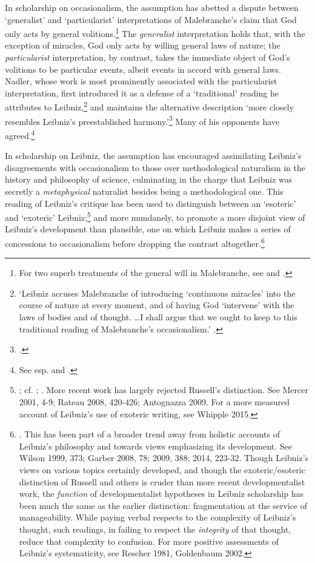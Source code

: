 \documentclass{article}
\begin{document}
In scholarship on occasionalism, the assumption has abetted a dispute
between `generalist' and `particularist' interpretations of
Malebranche's claim that God only acts by general volitions.\footnote{For
  two superb treatments of the general will in Malebranche, see \autocite{Schmaltz2008} and \autocite{Wahl2011}.} The \emph{generalist} interpretation holds that,
with the exception of miracles, God only acts by willing general laws of
nature; the \emph{particularist} interpretation, by contrast, takes the
immediate object of God's volitions to be particular events, albeit
events in accord with general laws. Nadler, whose work is most
prominently associated with the particularist interpretation, first
introduced it as a defense of a `traditional' reading he attributes to
Leibniz,\footnote{`Leibniz accuses Malebranche of introducing
  `continuous miracles' into the course of nature at every moment, and
  of having God `intervene' with the laws of bodies and of thought.
  \ldots I shall argue that we ought to keep to this traditional
  reading of Malebranche's occasionalism.' \autocite[32]{Nadler1993}.} and
maintains the alternative description `more closely resembles Leibniz's
preestablished harmony.'\footnote{\autocite[31]{Nadler1993}.} Many of his
opponents have agreed.\footnote{See esp. \autocite{Clarke1995} and \autocite{Scott1997}.}

In scholarship on Leibniz, the assumption has encouraged assimilating
Leibniz's disagreements with occasionalism to those over methodological
naturalism in the history and philosophy of science, culminating in the
charge that Leibniz was secretly a \emph{metaphysical} naturalist
besides being a methodological one. This reading of Leibniz's critique
has been used to distinguish between an `esoteric' and `exoteric'
Leibniz;\footnote{\autocite{Russell1951}; cf. \autocite{Shields1986}; \autocite[277-281]{Wilson1989}.
  More recent work has largely rejected Russell's distinction. See
  Mercer 2001, 4-9; Rateau 2008, 420-426; Antognazza 2009. For a more
  measured account of Leibniz's use of exoteric writing, see Whipple
  2015.} and more mundanely, to promote a more disjoint view of
Leibniz's development than plausible, one on which Leibniz makes a
series of concessions to occasionalism before dropping the contrast
altogether.\footnote{\autocite{Scott1997}. This has been part of a broader trend
  away from holistic accounts of Leibniz's philosophy and towards views
  emphasizing its development. See Wilson 1999, 373; Garber 2008, 78;
  2009, 388; 2014, 223-32. Though Leibniz's views on various topics
  certainly developed, and though the exoteric/esoteric distinction of
  Russell and others is cruder than more recent developmentalist work,
  the \emph{function} of developmentalist hypotheses in Leibniz
  scholarship has been much the same as the earlier distinction:
  fragmentation at the service of manageability. While paying verbal
  respects to the complexity of Leibniz's thought, such readings, in
  failing to respect the \emph{integrity} of that thought, reduce that
  complexity to confusion. For more positive assessments of Leibniz's
  systematicity, see Rescher 1981, Goldenbaum 2002.}
\end{document}
